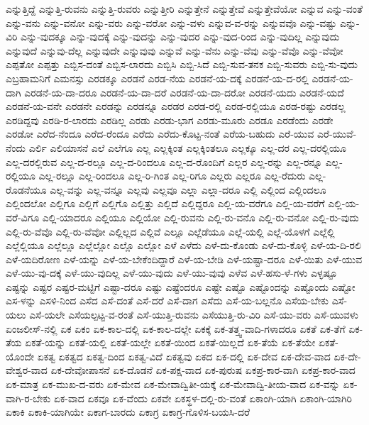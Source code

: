 {ಎನ್ನುತ್ತಿದ್ದೆ
ಎನ್ನುತ್ತಿ-ರುವನು
ಎನ್ನುತ್ತಿ-ರುವರು
ಎನ್ನುತ್ತೀರಿ
ಎನ್ನುತ್ತೇನೆ
ಎನ್ನುತ್ತೇವೆ
ಎನ್ನುತ್ತೇವೆಯೋ
ಎನ್ನುವ
ಎನ್ನು-ವಂತೆ
ಎನ್ನು-ವನು
ಎನ್ನು-ವನೋ
ಎನ್ನು-ವರು
ಎನ್ನು-ವರೋ
ಎನ್ನು-ವಳು
ಎನ್ನುವ-ವ-ರನ್ನು
ಎನ್ನುವವೊ
ಎನ್ನು-ವಷ್ಟು
ಎನ್ನು-ವಿರಿ
ಎನ್ನು-ವುದಕ್ಕೂ
ಎನ್ನು-ವುದಕ್ಕೆ
ಎನ್ನು-ವುದನ್ನು
ಎನ್ನು-ವುದರ
ಎನ್ನು-ವುದ-ರಿಂದ
ಎನ್ನು-ವುದಿಲ್ಲ
ಎನ್ನುವುದು
ಎನ್ನುವುದೆ
ಎನ್ನುವು-ದೆಲ್ಲ
ಎನ್ನುವುದೇ
ಎನ್ನುವುವು
ಎನ್ನುವೆ
ಎನ್ನು-ವೆನು
ಎನ್ನು-ವೆವು
ಎನ್ನು-ವೆವೊ
ಎನ್ನು-ವೆವೋ
ಎಪ್ಪತೋ
ಎಪ್ಪತ್ತು
ಎಬ್ಬಿಸ-ದಂತೆ
ಎಬ್ಬಿಸ-ಲಾರದು
ಎಬ್ಬಿಸಿ
ಎಬ್ಬಿ-ಸಿದೆ
ಎಬ್ಬಿ-ಸುವ-ತನಕ
ಎಬ್ಬಿ-ಸುವರು
ಎಬ್ಬಿ-ಸು-ವುದು
ಎಬ್ರಹಾಮನಿಗೆ
ಎಮನಸ್ಸು
ಎರಡಕ್ಕೂ
ಎರಡನೆ
ಎರಡ-ನೆಯ
ಎರಡನೆ-ಯ-ದಕ್ಕೆ
ಎರಡನೆ-ಯ-ದ-ರಲ್ಲಿ
ಎರಡನೆ-ಯ-ದಾಗಿ
ಎರಡನೆ-ಯ-ದಾ-ದರೂ
ಎರಡನೆ-ಯ-ದಾ-ದರೆ
ಎರಡನೆ-ಯ-ದಾ-ದರೋ
ಎರಡನೆ-ಯದು
ಎರಡನೆ-ಯದೆ
ಎರಡನೆ-ಯ-ವನೇ
ಎರಡನೇ
ಎರಡನ್ನು
ಎರಡನ್ನೂ
ಎರಡರ
ಎರಡ-ರಲ್ಲಿ
ಎರಡ-ರಲ್ಲಿಯೂ
ಎರಡ-ರಷ್ಟು
ಎರಡಲ್ಲ
ಎರಡಿದ್ದವು
ಎರಡಿ-ರ-ಲಾರದು
ಎರಡಿಲ್ಲ
ಎರಡು
ಎರಡು-ಭಾಗ
ಎರಡು-ಮೂರು
ಎರಡೂ
ಎರಡೆಂದು
ಎರಡೇ
ಎರಡೋ
ಎರೆದ-ನೆಂದೂ
ಎರೆದ-ರೆಂದೂ
ಎರೆದು
ಎರೆದು-ಕೊಟ್ಟ-ನಂತೆ
ಎರೆಯ-ಬಹುದು
ಎರೆ-ಯುವ
ಎರೆ-ಯುವೆ-ನೆಂದು
ಎರ್ಲಿ
ಎಲಿಯಾಸನೆ
ಎಲೆ
ಎಲೆಗೂ
ಎಲ್ಲ
ಎಲ್ಲಕ್ಕಿಂತ
ಎಲ್ಲಕ್ಕಿಂತಲೂ
ಎಲ್ಲಕ್ಕೂ
ಎಲ್ಲ-ದರ
ಎಲ್ಲ-ದರಲ್ಲಿಯೂ
ಎಲ್ಲ-ದರಲ್ಲಿರುವ
ಎಲ್ಲ-ದ-ರಲ್ಲೂ
ಎಲ್ಲ-ದ-ರಿಂದಲೂ
ಎಲ್ಲ-ದ-ರೊಂದಿಗೆ
ಎಲ್ಲರ
ಎಲ್ಲ-ರನ್ನು
ಎಲ್ಲ-ರನ್ನೂ
ಎಲ್ಲ-ರಲ್ಲಿಯೂ
ಎಲ್ಲ-ರಲ್ಲೂ
ಎಲ್ಲ-ರಿಂದಲೂ
ಎಲ್ಲ-ರಿ-ಗಿಂತ
ಎಲ್ಲ-ರಿಗೂ
ಎಲ್ಲರು
ಎಲ್ಲರೂ
ಎಲ್ಲ-ರೆದುರು
ಎಲ್ಲ-ರೊಡನೆಯೂ
ಎಲ್ಲ-ವನ್ನು
ಎಲ್ಲ-ವನ್ನೂ
ಎಲ್ಲವು
ಎಲ್ಲವೂ
ಎಲ್ಲಾ
ಎಲ್ಲಾ-ದರೂ
ಎಲ್ಲಿ
ಎಲ್ಲಿಂದ
ಎಲ್ಲಿಂದಲೂ
ಎಲ್ಲಿಂದಲೋ
ಎಲ್ಲಿಗೂ
ಎಲ್ಲಿಗೆ
ಎಲ್ಲಿಗೊ
ಎಲ್ಲಿತ್ತು
ಎಲ್ಲಿದೆ
ಎಲ್ಲಿದ್ದರೂ
ಎಲ್ಲಿ-ಯ-ವರೆಗೂ
ಎಲ್ಲಿ-ಯ-ವರೆಗೆ
ಎಲ್ಲಿ-ಯ-ವರೆ-ವಿಗೂ
ಎಲ್ಲಿ-ಯಾದರೂ
ಎಲ್ಲಿಯೂ
ಎಲ್ಲಿಯೋ
ಎಲ್ಲಿ-ರುವನು
ಎಲ್ಲಿ-ರು-ವನೊ
ಎಲ್ಲಿ-ರು-ವನೋ
ಎಲ್ಲಿ-ರು-ವುದು
ಎಲ್ಲಿ-ರು-ವೆವೊ
ಎಲ್ಲಿ-ರು-ವೆವೋ
ಎಲ್ಲಿಲ್ಲದ
ಎಲ್ಲಿವೆ
ಎಲ್ಲೂ
ಎಲ್ಲೆಡೆಯೂ
ಎಲ್ಲೆ-ಯಲ್ಲಿ
ಎಲ್ಲೆ-ಯೊಳಗೆ
ಎಲ್ಲೆಲ್ಲಿ
ಎಲ್ಲೆಲ್ಲಿಯೂ
ಎಲ್ಲೆಲ್ಲೂ
ಎಲ್ಲೆಲ್ಲೋ
ಎಲ್ಲೊ
ಎಲ್ಲೋ
ಎಳೆ
ಎಳೆದು
ಎಳೆ-ದು-ಕೊಂಡು
ಎಳೆ-ದು-ಕೊಳ್ಳಿ
ಎಳೆ-ಯ-ದಿ-ರಲಿ
ಎಳೆ-ಯದಿರೋಣ
ಎಳೆ-ಯನ್ನು
ಎಳೆ-ಯ-ಬೇಕೆಂದಿದ್ದಾರೆ
ಎಳೆ-ಯ-ಬೇಡಿ
ಎಳೆ-ಯಷ್ಟಾ-ದರೂ
ಎಳೆ-ಯಿತು
ಎಳೆ-ಯುವ
ಎಳೆ-ಯು-ವು-ದಕ್ಕೆ
ಎಳೆ-ಯು-ವುದಿಲ್ಲ
ಎಳೆ-ಯು-ವುದು
ಎಳೆ-ಯು-ವುವು
ಎಳೆವ
ಎಳೆ-ಹಸು-ಳೆ-ಗಳು
ಎಳ್ಳಷ್ಟೂ
ಎಷ್ಟನ್ನು
ಎಷ್ಟರ
ಎಷ್ಟರ-ಮಟ್ಟಿಗೆ
ಎಷ್ಟಾ-ದರೂ
ಎಷ್ಟು
ಎಷ್ಟೆಂದರೂ
ಎಷ್ಟೇ
ಎಷ್ಟೊ
ಎಷ್ಟೊಂದನ್ನು
ಎಷ್ಟೊಂದು
ಎಷ್ಟೋ
ಎಸ-ಳನ್ನು
ಎಸಳಿ-ನಿಂದ
ಎಸೆದ
ಎಸೆ-ದಂತೆ
ಎಸೆ-ದರೆ
ಎಸೆ-ದಾಗ
ಎಸೆದು
ಎಸೆ-ಯ-ಬಲ್ಲನೊ
ಎಸೆಯ-ಬೇಕು
ಎಸೆ-ಯಲು
ಎಸೆ-ಯಲೇ
ಎಸೆಯಲ್ಪಟ್ಟ-ವ-ರಂತೆ
ಎಸೆ-ಯುತ್ತಿ-ರುವನು
ಎಸೆಯುತ್ತಿ-ರು-ವಿರಿ
ಎಸೆ-ಯು-ವರು
ಎಸೆ-ಯುವಳು
ಏಂಜಲೀಸ್-ನಲ್ಲಿ
ಏಕ
ಏಕಂ
ಏಕ-ಕಾಲ-ದಲ್ಲಿ
ಏಕ-ಕಾಲ-ದಲ್ಲೇ
ಏಕಕ್ಕೆ
ಏಕ-ತತ್ತ್ವ-ವಾದಿ-ಗಳಾದರೂ
ಏಕತೆ
ಏಕ-ತೆಗೆ
ಏಕ-ತೆಯ
ಏಕತೆ-ಯನ್ನು
ಏಕತೆ-ಯಲ್ಲಿ
ಏಕತೆ-ಯಲ್ಲೇ
ಏಕತೆ-ಯಿಂದ
ಏಕತೆ-ಯಿಲ್ಲದೆ
ಏಕ-ತೆಯೆ
ಏಕ-ತೆಯೇ
ಏಕತೆ-ಯೊಂದೇ
ಏಕತ್ವ
ಏಕತ್ವದ
ಏಕತ್ವ-ದಿಂದ
ಏಕತ್ವ-ವಿದೆ
ಏಕತ್ವವು
ಏಕದ
ಏಕ-ದಲ್ಲಿ
ಏಕ-ದೇವ
ಏಕ-ದೇವ-ವಾದ
ಏಕ-ದೇ-ವೇಶ್ವರ-ವಾದ
ಏಕ-ದೇವೋಪಾಸನೆ
ಏಕ-ದೊಡನೆ
ಏಕ-ಪಕ್ಷ-ವಾದ
ಏಕ-ಪುರುಷ
ಏಕಪ್ರ-ಕಾರ-ವಾಗಿ
ಏಕಪ್ರ-ಕಾರ-ವಾದ
ಏಕ-ಮಾತ್ರ
ಏಕ-ಮುಖ-ದ-ವರು
ಏಕ-ಮೇವ
ಏಕ-ಮೇವಾದ್ವಿತೀ-ಯಕ್ಕೆ
ಏಕ-ಮೇವಾದ್ವಿ-ತೀಯ-ವಾದ
ಏಕ-ವನ್ನು
ಏಕ-ವಾಗಿ-ರ-ಬೇಕು
ಏಕ-ವಾದ
ಏಕವೂ
ಏಕ-ವೆಂದು
ಏಕವೇ
ಏಕಸ್ಥಳ-ದಲ್ಲಿ-ರು-ವಂತೆ
ಏಕಾಂಗಿ-ಯಾಗಿ
ಏಕಾಂಗಿ-ಯಾಗಿರಿ
ಏಕಾಕಿ
ಏಕಾಕಿ-ಯಾಗಿಯೇ
ಏಕಾಗ-ಬಾರದು
ಏಕಾಗ್ರ
ಏಕಾಗ್ರ-ಗೊಳಿಸ-ಬಯಸಿ-ದರೆ
}
